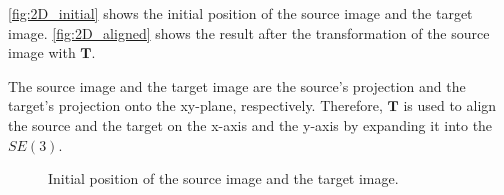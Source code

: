             \autoref{fig:2D_initial} shows the initial position of the source image and the target image.
            \autoref{fig:2D_aligned} shows the result after the transformation of the source image with $\pmb{T}$.

            The source image and the target image are the source’s projection and the target’s projection onto the xy-plane, respectively. 
            Therefore, $\pmb{T}$ is used to align the source and the target on the x-axis and the y-axis by expanding it into the $SE(3)$.

            
            \begin{figure}[htp]
                \centering
                \caption{Initial position of the source image and the target image.}
                \label{fig:2D_initial}
            \end{figure}


